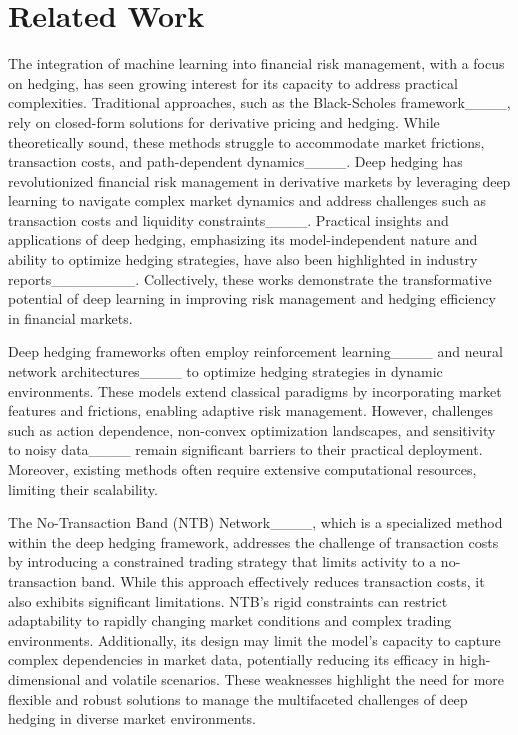 \section{Related Work}
\label{related}
The integration of machine learning into financial risk management, with a focus on hedging, has seen growing interest for its capacity to address practical complexities.  Traditional approaches, such as the Black-Scholes framework____, rely on closed-form solutions for derivative pricing and hedging. While theoretically sound, these methods struggle to accommodate market frictions, transaction costs, and path-dependent dynamics____. 
Deep hedging has revolutionized financial risk management in derivative markets by leveraging deep learning to navigate complex market dynamics and address challenges such as transaction costs and liquidity constraints____. Practical insights and applications of deep hedging, emphasizing its model-independent nature and ability to optimize hedging strategies, have also been highlighted in industry reports________. Collectively, these works demonstrate the transformative potential of deep learning in improving risk management and hedging efficiency in financial markets.

Deep hedging frameworks often employ reinforcement learning____ and neural network architectures____ to optimize hedging strategies in dynamic environments. These models extend classical paradigms by incorporating market features and frictions, enabling adaptive risk management. However, challenges such as action dependence, non-convex optimization landscapes, and sensitivity to noisy data____ remain significant barriers to their practical deployment. Moreover, existing methods often require extensive computational resources, limiting their scalability.


The No-Transaction Band (NTB) Network____, which is a specialized method within the deep hedging framework, addresses the challenge of transaction costs by introducing a constrained trading strategy that limits activity to a no-transaction band. While this approach effectively reduces transaction costs, it also exhibits significant limitations. NTB's rigid constraints can restrict adaptability to rapidly changing market conditions and complex trading environments. Additionally, its design may limit the model's capacity to capture complex dependencies in market data, potentially reducing its efficacy in high-dimensional and volatile scenarios. These weaknesses highlight the need for more flexible and robust solutions to manage the multifaceted challenges of deep hedging in diverse market environments.


